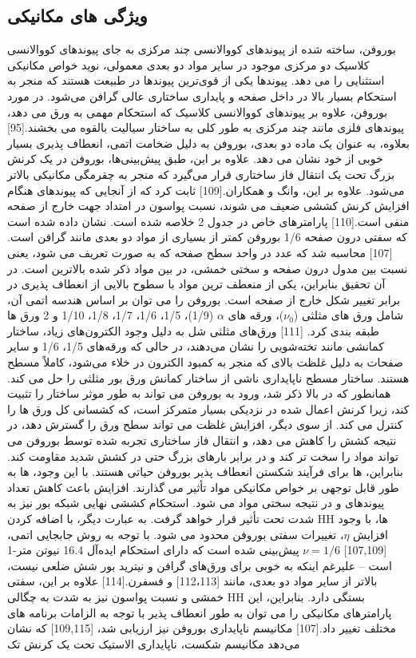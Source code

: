 \subsection{ویژگی های مکانیکی}
بوروفن، ساخته شده از پیوندهای کووالانسی چند مرکزی به جای پیوندهای کووالانسی کلاسیک دو مرکزی موجود در سایر مواد دو بعدی معمولی، نوید خواص مکانیکی استثنایی را می دهد. پیوندها یکی از قوی‌ترین پیوندها در طبیعت هستند که منجر به استحکام بسیار بالا در داخل صفحه و پایداری ساختاری عالی گرافن می‌شود. در مورد بوروفن، علاوه بر پیوندهای کووالانسی کلاسیک که استحکام مهمی به ورق می دهد، پیوندهای فلزی مانند چند مرکزی به طور کلی به ساختار سیالیت بالقوه می بخشند.[95] بعلاوه، به عنوان یک ماده دو بعدی، بوروفن به دلیل ضخامت اتمی، انعطاف پذیری بسیار خوبی از خود نشان می دهد. علاوه بر این، طبق پیش‌بینی‌ها، بوروفن در یک کرنش بزرگ تحت یک انتقال فاز ساختاری قرار می‌گیرد که منجر به چقرمگی مکانیکی بالاتر می‌شود. علاوه بر این، وانگ و همکاران.[109] ثابت کرد که از آنجایی که پیوندهای  هنگام افزایش کرنش کششی ضعیف می شوند، نسبت پواسون در امتداد جهت خارج از صفحه منفی است.[110] پارامترهای خاص در جدول 2 خلاصه شده است. نشان داده شده است که سفتی درون صفحه 1/6 بوروفن کمتر از بسیاری از مواد دو بعدی مانند گرافن است.[107] محاسبه شد که عدد  در واحد سطح صفحه  که به صورت  تعریف می شود، یعنی نسبت بین مدول درون صفحه و سختی خمشی، در بین مواد ذکر شده بالاترین است. در آن تحقیق بنابراین، یکی از منعطف ترین مواد با سطوح بالایی از انعطاف پذیری در برابر تغییر شکل خارج از صفحه است. بوروفن را می توان بر اساس هندسه اتمی آن، شامل ورق های مثلثی ($\nu_0$)، ورقه های $\alpha$ (1/9)، 1/5، 1/6، 1/7، 1/8، 1/10 و 2 ورق ها طبقه بندی کرد. [111] ورق‌های مثلثی شل به دلیل وجود الکترون‌های زیاد، ساختار کمانشی مانند تخته‌شویی را نشان می‌دهند، در حالی که ورقه‌های 1/5، 1/6 و سایر صفحات به دلیل غلظت بالای  که منجر به کمبود الکترون در خلاء می‌شود، کاملاً مسطح هستند. ساختار مسطح ناپایداری ناشی از ساختار کمانش ورق بور مثلثی را حل می کند. همانطور که در بالا ذکر شد، ورود  به بوروفن می تواند به طور موثر ساختار را تثبیت کند، زیرا کرنش اعمال شده در نزدیکی  بسیار متمرکز است، که کشسانی کل ورق ها را کنترل می کند. از سوی دیگر، افزایش غلظت  می تواند سطح ورق را گسترش دهد، در نتیجه کشش را کاهش می دهد، و انتقال فاز ساختاری تجربه شده توسط بوروفن می تواند مواد را سخت تر کند و در برابر بارهای بزرگ حتی در کشش شدید مقاومت کند. بنابراین،  ها برای فرآیند شکستن انعطاف پذیر بوروفن حیاتی هستند. با این وجود،  ها به طور قابل توجهی بر خواص مکانیکی مواد تأثیر می گذارند. افزایش  باعث کاهش تعداد پیوندهای  و در نتیجه سختی مواد می شود. استحکام کششی نهایی شبکه بور نیز به شدت تحت تأثیر قرار خواهد گرفت. به عبارت دیگر، با اضافه کردن HH ها، با وجود افزایش $\eta$، تغییرات سفتی بوروفن محدود می شود. با توجه به روش جابجایی اتمی، [107,109] $\nu=1/6$ پیش‌بینی شده است که دارای استحکام ایده‌آل 16.4 نیوتن متر-1 است – علیرغم اینکه به خوبی برای ورق‌های گرافن و نیترید بور شش ضلعی  نیست، بالاتر از سایر مواد دو بعدی، مانند  [112،113] و فسفرن.[114] علاوه بر این، سفتی خمشی و نسبت پواسون نیز به شدت به چگالی HH بستگی دارد. بنابراین، این پارامترهای مکانیکی را می توان به طور انعطاف پذیر با توجه به الزامات برنامه های مختلف تغییر داد.[107] مکانیسم ناپایداری بوروفن نیز ارزیابی شد، [109,115] که نشان می‌دهد مکانیسم شکست، ناپایداری الاستیک تحت یک کرنش تک 